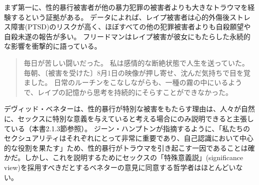 \documentclass[paper=a4,book,openany]{jlreq}
\newcommand{\ig}[1]{}           %
\begin{document}
まず第一に、性的暴行被害者が他の暴力犯罪の被害者よりも大きなトラウマを経験するという証拠がある。
データによれば、レイプ被害者は心的外傷後ストレス障害(PTSD)のリスクが高く、ほぼすべての他の犯罪被害者よりも自殺願望や自殺未遂の報告が多い\citep[p.104]{wertheimer03:_consen_sexual_relat}。
フリードマン\ig{Karyn L. Freedman}はレイプ被害が彼女にもたらした永続的な影響を衝撃的に語っている。

\begin{quote}
毎日が苦しい闘いだった。
私は感情的な断絶状態で人生を送っていた。
毎朝、〔被害を受けた〕8月1日の映像が押し寄せ、沈んだ気持ちで目を覚ました。
日常のルーチンをこなしながらも、一種の霧の中にいるようで、レイプの記憶から思考を持続的にそらすことができなかった。
\citep{freedman14:_one_hour_paris}
\end{quote}

デヴィッド・ベネター\ig{David Benatar}は、性的暴行が特別な被害をもたらす理由は、人々が自然に、セックスに特別な意義を与えていると考える場合にのみ説明できると主張している（本書2.1.3節参照）。
ジーン・ハンプトン\ig{Jean Hampton}が指摘するように、「私たちのセクシュアリティはそれぞれにとって非常に重要であり、自己認識において中心的な役割を果たす」ため、性的暴行がトラウマを引き起こす一因であることは確かだ\citep[p.151]{hampton99:_defin_wrong_and_defin_rape}。しかし、これを説明するためにセックスの「特殊意義説」(significance view)を採用すべきだとするベネター\ig{Benatar}の意見に同意する哲学者はほとんどいない。
\end{document}
